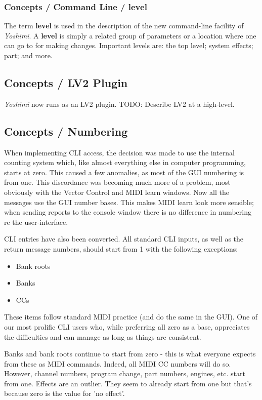 \subsubsection{Concepts / Command Line / level}
\label{subsubsec:concepts_command_line_level}

   The term \textbf{level} is used in the description of the new command-line
   facility of \textsl{Yoshimi}.
   A \textbf{level} is simply a related group of parameters or a location where
   one can go to for making changes.
   Important levels are:  the top level; system effects; part; and more.

\subsection{Concepts / LV2 Plugin}
\label{subsec:concepts_lv2_plugin}

   \textsl{Yoshimi} now runs as an LV2 plugin.
   TODO: Describe LV2 at a high-level.

\subsection{Concepts / Numbering}
\label{subsec:concepts_numbering}

   When implementing CLI access, the decision was made to use the internal
   counting system which, like almost everything else in computer programming,
   starts at zero. This caused a few anomalies, as most of the GUI numbering is
   from one.  This discordance was becoming much more of a problem, most
   obviously with the Vector Control and MIDI learn windows.
   Now all the messages use the GUI number bases.
   This makes MIDI learn look more sensible; when sending
   reports to the console window there is no difference in numbering re the
   user-interface.

   CLI entries have also been converted. All standard CLI inputs, as well as the
   return message numbers, should start from 1 with the following exceptions:

   \begin{itemize}
      \item Bank roots
      \item Banks
      \item CCs
   \end{itemize}

   These items follow standard MIDI practice (and do the same in the GUI).
   One of our most prolific CLI users who, while preferring all zero as a base,
   appreciates the difficulties and can manage as long as things are consistent.

   Banks and bank roots continue to start from zero - this is what everyone
   expects from these as MIDI commands. Indeed, all MIDI
   CC numbers will do so. However, channel numbers, program change, part
   numbers, engines, etc. start from one. Effects are an outlier. They seem
   to already start from one but that's because zero is the value for 'no
   effect'.

